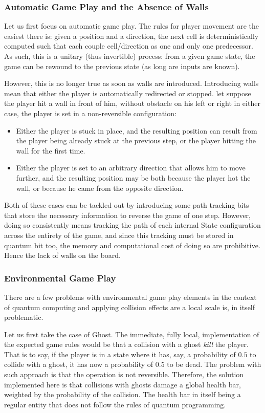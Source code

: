 \documentclass[a4paper]{article}
\begin{document}
\subsubsection{Automatic Game Play and the Absence of Walls}

Let us first focus on automatic game play. The rules for player movement are the easiest there is: given a position and a direction, the next cell is deterministically computed such that each couple cell/direction as one and only one predecessor. As such, this is a unitary (thus invertible) process: from a given game state, the game can be rewound to the previous state (as long are inputs are known).

However, this is no longer true as soon as walls are introduced. Introducing walls mean that either the player is automatically redirected or stopped. let suppose the player hit a wall in front of him, without obstacle on his left or right in either case, the player is set in a non-reversible configuration:
\begin{itemize}
\item Either the player is stuck in place, and the resulting position can result from the player being already stuck at the previous step, or the player hitting the wall for the first time.
\item Either the player is set to an arbitrary direction that allows him to move further, and the resulting position may be both because the player hot the wall, or because he came from the opposite direction.  
\end{itemize}

Both of these cases can be tackled out by introducing some path tracking bits that store the necessary information to reverse the game of one step. However, doing so consistently means tracking the path of each internal State configuration across the entirety of the game, and since this tracking must be stored in quantum bit too, the memory and computational cost of doing so are prohibitive. Hence the lack of walls on the board.

\subsubsection{Environmental Game Play}

There are a few problems with environmental game play elements in the context of quantum computing and applying collision effects are a local scale is, in itself problematic.

Let us first take the case of Ghost. The immediate, fully local, implementation of the expected game rules would be that a collision with a ghost \emph{kill} the player. That is to say, if the player is in a state where it has, say, a probability of $0.5$ to collide with a ghost, it has now a  probability of $0.5$ to be dead. The problem with such approach is that the operation is not reversible. Therefore, the solution implemented here is that collisions with ghosts damage a global health bar, weighted by the probability of the collision. The health bar in itself being a regular entity that does not follow the rules of quantum programming.
\end{document}
